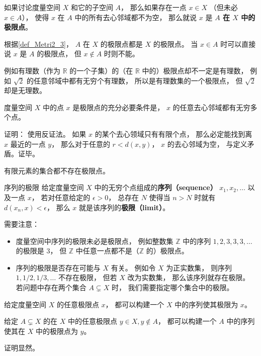 \begin{definition}{}\label{def_Metri2_4}
如果讨论度量空间 $X$ 和它的子空间 $A$， 那么如果存在一点 $x \in X$ （但未必 $x \in A$）， 使得 $x$ 在 $A$ 中的所有去心邻域都不为空， 那么就说 $x$ 是 \textbf{$A$ 在 $X$ 中的极限点}。

根据\autoref{def_Metri2_3}， $A$ 在 $X$ 的极限点都是 $X$ 的极限点。 当 $x \in A$ 时可以直接说 $x$ 是 $A$ 的极限点， 但 $x \notin A$ 时则不能。
\end{definition}

例如有理数（作为 $\mathbb R$ 的一个子集）的（在 $\mathbb R$ 中的）极限点却不一定是有理数， 例如 $\sqrt{2}$ 的任意邻域中都有无穷个有理数， 所以是有理数集的一个极限点， 但 $\sqrt{2}$ 却是无理数。

\begin{corollary}{}
度量空间 $X$ 中的点 $x$ 是极限点的充分必要条件是， $x$ 的任意去心邻域都有无穷多个点。
\end{corollary}
证明： 使用反证法。 如果 $x$ 的某个去心领域只有有限个点， 那么必定能找到离 $x$ 最近的一点 $y$， 那么对于任意的 $r < d(x, y)$， $x$ 的去心邻域为空， 与定义矛盾。证毕。

\begin{corollary}{}
有限元素的集合都不存在极限点。
\end{corollary}

\begin{definition}{序列的极限}\label{def_Metri2_1}
给定度量空间 $X$ 中的无穷个点组成的\textbf{序列（sequence）} $x_1, x_2, \dots$ 以及一点 $x$， 若对任意给定的 $\epsilon > 0$， 总存在 $N$ 使得当 $n > N$ 时就有 $d(x_n, x) < \epsilon$， 那么 $x$ 就是该序列的\textbf{极限（limit）}。
\end{definition}
需要注意：
\begin{itemize}
\item 度量空间中序列的极限未必是极限点， 例如整数集 $\mathbb Z$ 中的序列 $1, 2, 3, 3, 3, \dots$ 的极限是 $3$， 但 $\mathbb Z$ 中任意一点都不是（$\mathbb Z$ 的）极限点。
\item 序列的极限是否存在可能与 $X$ 有关。 例如令 $X$ 为正实数集， 则序列 $1, 1/2, 1/3, \dots$ 不存在极限， 但若 $X$ 改为实数集， 那么该序列就存在极限。 若问题中存在两个集合 $A \subsetneq X$ 时， 我们需要指定哪个集合中的极限。
\end{itemize}

\begin{corollary}{}
给定度量空间 $X$ 的任意极限点 $x$， 都可以构建一个 $X$ 中的序列使其极限为 $x$。

给定 $A \subsetneq X$ 的在 $X$ 中的任意极限点 $y \in X, y \notin A$， 都可以构建一个 $A$ 中的序列使其在 $X$ 中的极限点为 $y$。
\end{corollary}
证明显然。

